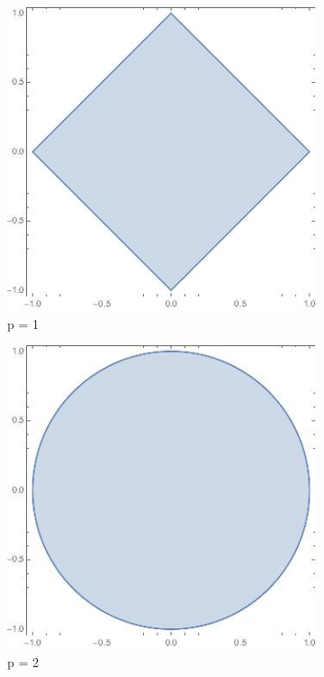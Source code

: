 \documentclass[12pt,letterpaper,reqno]{amsart}
\begin{document}
\begin{enumerate}[1.]
\begin{enumerate}[(a)]
\begin{figure}[h]
\centering
\begin{subfigure}{.33\textwidth}
  \centering
  \includegraphics[width=.8\linewidth]{./norm-1.jpeg}
  \caption*{p = 1}
\end{subfigure}%
\begin{subfigure}{.33\textwidth}
  \centering
  \includegraphics[width=.8\linewidth]{./norm-2.jpeg}
  \caption*{p = 2}
\end{subfigure}
\begin{subfigure}{.33\textwidth}
  \centering

\end{subfigure}
\end{figure}
\end{enumerate}
\end{enumerate}
\end{document}
